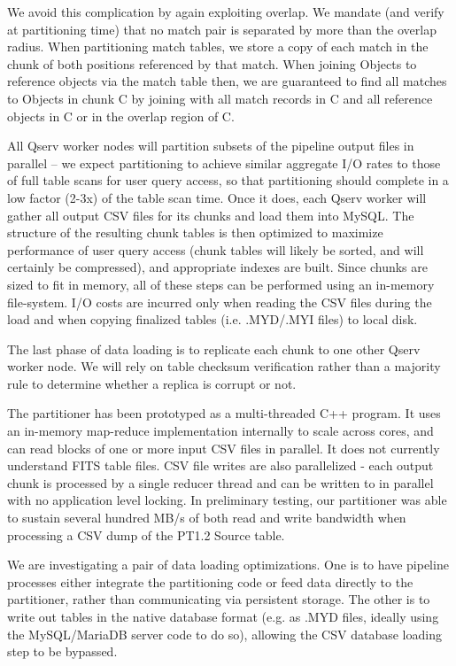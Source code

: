 \documentclass[DM,lsstdraft,toc]{lsstdoc}
\begin{document}
We avoid this complication by again exploiting overlap. We mandate (and
verify at partitioning time) that no match pair is separated by more
than the overlap radius. When partitioning match tables, we store a copy
of each match in the chunk of both positions referenced by that match.
When joining Objects to reference objects via the match table then, we
are guaranteed to find all matches to Objects in chunk C by joining with
all match records in C and all reference objects in C or in the overlap
region of C.

All Qserv worker nodes will partition subsets of the pipeline output
files in parallel -- we expect partitioning to achieve similar aggregate
I/O rates to those of full table scans for user query access, so that
partitioning should complete in a low factor (2-3x) of the table scan
time. Once it does, each Qserv worker will gather all output CSV files
for its chunks and load them into MySQL. The structure of the resulting
chunk tables is then optimized to maximize performance of user query
access (chunk tables will likely be sorted, and will certainly be
compressed), and appropriate indexes are built. Since chunks are sized
to fit in memory, all of these steps can be performed using an in-memory
file-system. I/O costs are incurred only when reading the CSV files
during the load and when copying finalized tables (i.e. .MYD/.MYI files)
to local disk.

The last phase of data loading is to replicate each chunk to one other
Qserv worker node. We will rely on table checksum verification rather
than a majority rule to determine whether a replica is corrupt or not.

The partitioner has been prototyped as a multi-threaded C++ program. It
uses an in-memory map-reduce implementation internally to scale across
cores, and can read blocks of one or more input CSV files in parallel.
It does not currently understand FITS table files. CSV file writes are
also parallelized - each output chunk is processed by a single reducer
thread and can be written to in parallel with no application level
locking. In preliminary testing, our partitioner was able to sustain
several hundred MB/s of both read and write bandwidth when processing a
CSV dump of the PT1.2 Source table.

We are investigating a pair of data loading optimizations. One is to
have pipeline processes either integrate the partitioning code or feed
data directly to the partitioner, rather than communicating via
persistent storage. The other is to write out tables in the native
database format (e.g. as .MYD files, ideally using the MySQL/MariaDB
server code to do so), allowing the CSV database loading step to be
bypassed.
\end{document}
